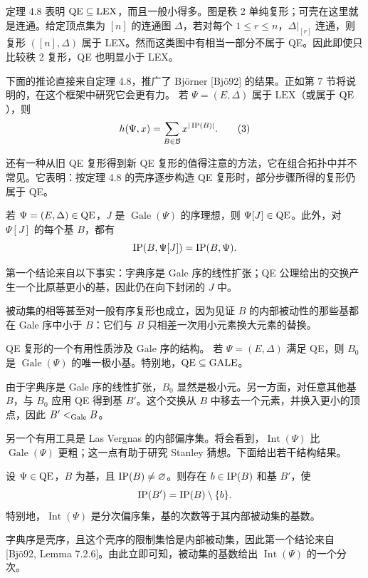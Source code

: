 定理 4.8 表明 $\mathrm{QE}\subseteq\mathrm{LEX}$，而且一般小得多。图是秩 2 单纯复形；可壳在这里就是连通。给定顶点集为 $[n]$ 的连通图 $\Delta$，若对每个 $1\le r\le n$，$\Delta|_{[r]}$ 连通，则复形 $([n],\Delta)$ 属于 LEX。然而这类图中有相当一部分不属于 QE。因此即使只比较秩 2 复形，QE 也明显小于 LEX。

下面的推论直接来自定理 4.8，推广了 Björner [Bjö92] 的结果。正如第 7 节将说明的，在这个框架中研究它会更有力。
若 $\Psi=(E,\Delta)$ 属于 $\mathrm{LEX}$（或属于 $\mathrm{QE}$），则
\begin{equation}
h(\Psi,x)=\sum_{B\in\mathcal B}x^{|\operatorname{IP}(B)|}.\tag{3}
\end{equation}

还有一种从旧 QE 复形得到新 QE 复形的值得注意的方法，它在组合拓扑中并不常见。它表明：按定理 4.8 的壳序逐步构造 QE 复形时，部分步骤所得的复形仍属于 QE。

若 $\Psi=(E,\Delta)\in\mathrm{QE}$，$J$ 是 $\operatorname{Gale}(\Psi)$ 的序理想，则 $\Psi[J]\in\mathrm{QE}$。此外，对 $\Psi[J]$ 的每个基 $B$，都有
\[
\operatorname{IP}(B,\Psi[J])=\operatorname{IP}(B,\Psi).
\]
\begin{proofcn}
第一个结论来自以下事实：字典序是 Gale 序的线性扩张；QE 公理给出的交换产生一个比原基更小的基，因此仍在向下封闭的 $J$ 中。

被动集的相等甚至对一般有序复形也成立，因为见证 $B$ 的内部被动性的那些基都在 Gale 序中小于 $B$：它们与 $B$ 只相差一次用小元素换大元素的替换。
\end{proofcn}

QE 复形的一个有用性质涉及 Gale 序的结构。
若 $\Psi=(E,\Delta)$ 满足 QE，则 $B_0$ 是 $\operatorname{Gale}(\Psi)$ 的唯一极小基。特别地，$\mathrm{QE}\subseteq\mathrm{GALE}$。
\begin{proofcn}
由于字典序是 Gale 序的线性扩张，$B_0$ 显然是极小元。另一方面，对任意其他基 $B$，与 $B_0$ 应用 QE 得到基 $B'$。这个交换从 $B$ 中移去一个元素，并换入更小的顶点，因此 $B'<_{\mathrm{Gale}}B$。
\end{proofcn}

另一个有用工具是 Las Vergnas 的内部偏序集。将会看到，$\operatorname{Int}(\Psi)$ 比 $\operatorname{Gale}(\Psi)$ 更粗；这一点有助于研究 Stanley 猜想。下面给出若干结构结果。

设 $\Psi\in\mathrm{QE}$，$B$ 为基，且 $\operatorname{IP}(B)\ne\varnothing$。则存在 $b\in\operatorname{IP}(B)$ 和基 $B'$，使
\[
\operatorname{IP}(B')=\operatorname{IP}(B)\setminus\{b\}.
\]
特别地，$\operatorname{Int}(\Psi)$ 是分次偏序集，基的次数等于其内部被动集的基数。
\begin{proofcn}
字典序是壳序，且这个壳序的限制集恰是内部被动集，因此第一个结论来自 [Bjö92, Lemma 7.2.6]。由此立即可知，被动集的基数给出 $\operatorname{Int}(\Psi)$ 的一个分次。
\end{proofcn}

